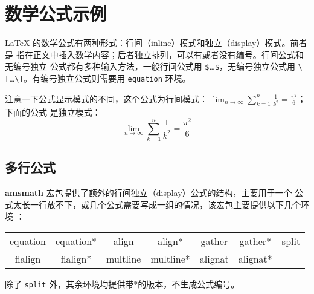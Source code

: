 \section{数学公式示例}
\label{sec:equation}

\LaTeX{} 的数学公式有两种形式：行间（inline）模式和独立（display）模式。前者是
指在正文中插入数学内容；后者独立排列，可以有或者没有编号。行间公式和无编号独立
公式都有多种输入方法，一般行间公式用 \verb|$|\ldots \verb|$|，无编号独立公式用
\verb|\[|\ldots \verb|\]|。有编号独立公式则需要用 \texttt{equation} 环境。

注意一下公式显示模式的不同，这个公式为行间模式：
$\lim_{n \to \infty} \sum_{k=1}^n \frac{1}{k^2} = \frac{\pi^2}{6}$；下面的公式
是独立模式：
\[\lim_{n \to \infty} \sum_{k=1}^n \frac{1}{k^2} = \frac{\pi^2}{6}\]

\subsection{多行公式}

\textbf{amsmath} 宏包提供了额外的行间独立（display）公式的结构，主要用于一个
公式太长一行放不下，或几个公式需要写成一组的情况，该宏包主要提供以下几个环境
：
\begin{center}
\begin{tabular}[c]{ccccccc}
equation & equation* & align & align* & gather & gather* & split \\
flalign & flalign* & multline & multline* & alignat & alignat* & \\
\end{tabular}
\end{center}

除了 \texttt{split} 外，其余环境均提供带*的版本，不生成公式编号。

% 
% 

